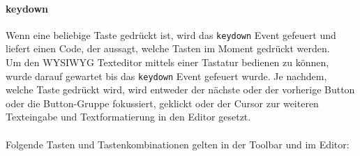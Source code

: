 \paragraph{keydown}
Wenn eine beliebige Taste gedrückt ist, wird das \texttt{keydown} Event gefeuert und liefert einen Code, der aussagt, welche Tasten im Moment gedrückt werden.\\
Um den WYSIWYG Texteditor mittels einer Tastatur bedienen zu können, wurde darauf gewartet bis das \texttt{keydown} Event gefeuert wurde. Je nachdem, welche Taste gedrückt wird, wird entweder der nächste oder der vorherige Button oder die Button-Gruppe fokussiert, geklickt oder der Cursor zur weiteren Texteingabe und Textformatierung in den Editor gesetzt.\\
\\Folgende Tasten und Tastenkombinationen gelten in der Toolbar und im Editor:

